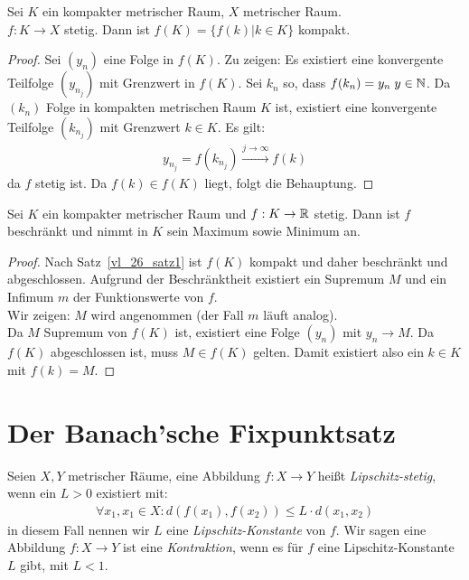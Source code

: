 \begin{Satz}\label{vl_26_satz1}%
	Sei $K$ ein kompakter metrischer Raum, $X$ metrischer Raum. \\
	$f: K \rightarrow X$ 
	stetig. Dann ist $f(K) = \{f(k)\vert k \in K\}$ kompakt.
\end{Satz}

\begin{proof}
	Sei $(y_n)$ eine Folge in $f(K)$. Zu zeigen: Es existiert eine konvergente 
	Teilfolge $(y_{n_j})$ mit Grenzwert in $f(K)$. Sei $k_n$ so, dass $f(k_n) 
	= y_n \; y \in \mathbb{N}$. Da $(k_n)$ Folge in kompakten metrischen Raum $K$ ist, 
	existiert eine konvergente Teilfolge $(k_{n_j})$ mit Grenzwert $k \in K$. Es 
	gilt: 
	\begin{align*}
		y_{n_j} = f(k_{n_j}) \xrightarrow{j \rightarrow \infty} f(k)
	\end{align*}
	da $f$ stetig ist. Da $f(k) \in f(K)$ liegt, folgt die Behauptung.
\end{proof}

\begin{Korollar}%
	Sei $K$ ein kompakter metrischer Raum und $f: K \rightarrow \mathbb{R}$ stetig. 
	Dann ist $f$ beschränkt und nimmt in $K$ sein Maximum sowie Minimum an.
\end{Korollar}

\begin{proof}
	Nach Satz~\ref{vl_26_satz1} ist $f(K)$ kompakt und daher beschränkt und 
	abgeschlossen. Aufgrund der Beschränktheit existiert ein Supremum $M$ und 
	ein Infimum $m$ der Funktionswerte von $f$. \\
	Wir zeigen: $M$ wird angenommen (der Fall $m$ läuft analog).\\
	Da $M$ Supremum von $f(K)$ ist, existiert eine Folge $(y_n)$ mit 
	$y_n \rightarrow M$. Da $f(K)$ abgeschlossen ist, muss $M \in f(K)$ gelten. 
	Damit existiert also ein $k \in K$ mit $f(k) = M$. 
\end{proof}

\cleardoublepage
\section{Der Banach'sche Fixpunktsatz}

\begin{Definition}%
	Seien $X,Y$ metrischer Räume, eine Abbildung $f: X \rightarrow Y$ heißt 
	\emph{Lipschitz-stetig}, wenn ein $L > 0$ existiert mit:
	\begin{align*}
		\forall x_1, x_1 \in X: d(f(x_1),f(x_2)) \leq L \cdot d(x_1,x_2)
	\end{align*}
	in diesem Fall nennen wir $L$ eine \emph{Lipschitz-Konstante} von $f$.
	Wir sagen eine Abbildung $f: X \rightarrow Y$ ist eine \emph{Kontraktion}, 
	wenn es für $f$ eine Lipschitz-Konstante $L$ gibt, mit $L < 1$.
\end{Definition}

